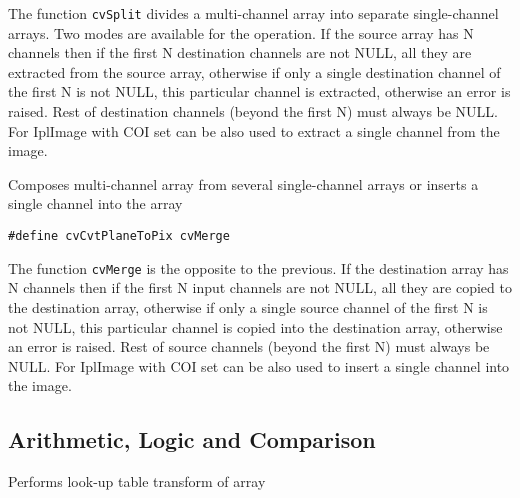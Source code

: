 The function \texttt{cvSplit} divides a multi-channel array into separate
single-channel arrays. Two modes are available for the operation. If the
source array has N channels then if the first N destination channels
are not NULL, all they are extracted from the source array, otherwise
if only a single destination channel of the first N is not NULL, this
particular channel is extracted, otherwise an error is raised. Rest
of destination channels (beyond the first N) must always be NULL. For
IplImage  with COI set can be also used to extract a single
channel from the image.



Composes multi-channel array from several single-channel arrays or inserts a single channel into the array


\begin{lstlisting}
#define cvCvtPlaneToPix cvMerge
\end{lstlisting}

\begin{description}
\end{description}

The function \texttt{cvMerge} is the opposite to the previous. If the destination array has N channels then if the first N input channels are not NULL, all they are copied to the destination array, otherwise if only a single source channel of the first N is not NULL, this particular channel is copied into the destination array, otherwise an error is raised. Rest of source channels (beyond the first N) must always be NULL. For IplImage  with COI set can be also used to insert a single channel into the image.


\subsection{Arithmetic, Logic and Comparison}


Performs look-up table transform of array



